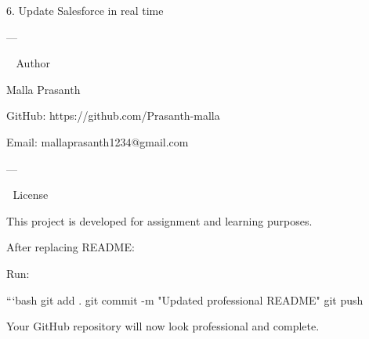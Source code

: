 6. Update Salesforce in real time




---

👨‍💻 Author

Malla Prasanth

GitHub: https://github.com/Prasanth-malla

Email: mallaprasanth1234@gmail.com



---

📄 License

This project is developed for assignment and learning purposes.

After replacing README:

Run:

```bash
git add .
git commit -m "Updated professional README"
git push

Your GitHub repository will now look professional and complete.
